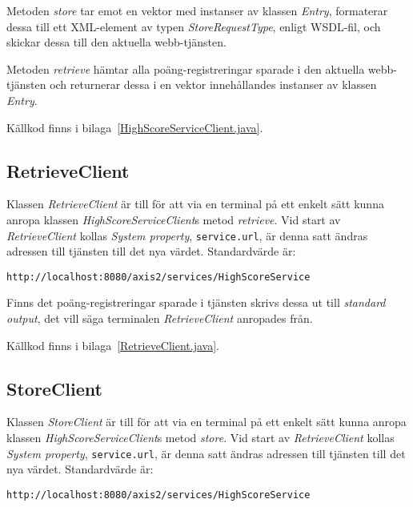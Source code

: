 \documentclass[a4paper, 12pt]{article}
\begin{document}
Metoden \textit{store} tar emot en vektor med instanser av klassen
\textit{Entry}, formaterar dessa till ett XML-element av typen
\textit{StoreRequestType}, enligt WSDL-fil, och skickar dessa till den
aktuella webb-tjänsten.

Metoden \textit{retrieve} hämtar alla poäng-registreringar sparade i
den aktuella webb-tjänsten och returnerar dessa i en vektor
innehållandes instanser av klassen \textit{Entry}.

Källkod finns i bilaga~\ref{HighScoreServiceClient.java}.

\subsection{RetrieveClient}
Klassen \textit{RetrieveClient} är till för att via en terminal på ett
enkelt sätt kunna anropa klassen \textit{HighScoreServiceClient}s
metod \textit{retrieve}. Vid start av \textit{RetrieveClient} kollas
\textit{System property}, \verb!service.url!, är denna satt ändras
adressen till tjänsten till det nya värdet. Standardvärde är:

\begin{footnotesize}
\begin{verbatim}
http://localhost:8080/axis2/services/HighScoreService
\end{verbatim}
\end{footnotesize}

Finns det poäng-registreringar sparade i tjänsten skrivs dessa ut till
\textit{standard output}, det vill säga terminalen
\textit{RetrieveClient} anropades från.

Källkod finns i bilaga~\ref{RetrieveClient.java}.

\subsection{StoreClient}
Klassen \textit{StoreClient} är till för att via en terminal på ett
enkelt sätt kunna anropa klassen \textit{HighScoreServiceClient}s
metod \textit{store}. Vid start av \textit{RetrieveClient} kollas
\textit{System property}, \verb!service.url!, är denna satt ändras
adressen till tjänsten till det nya värdet. Standardvärde är:

\begin{footnotesize}
\begin{verbatim}
http://localhost:8080/axis2/services/HighScoreService
\end{verbatim}
\end{footnotesize}
\end{document}
